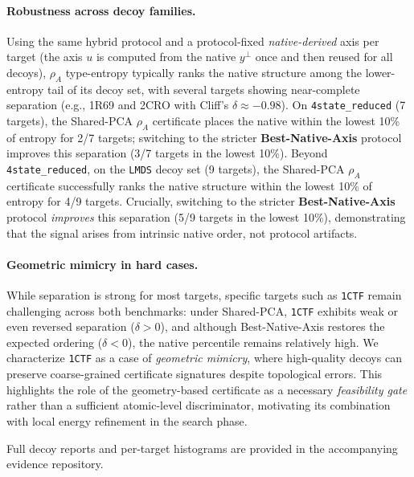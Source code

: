 \paragraph{Robustness across decoy families.}
Using the same hybrid protocol and a protocol-fixed \emph{native-derived} axis per target (the axis $u$ is computed from the native $y^\perp$ once and then reused for all decoys), $\rho_A$ type-entropy typically ranks the native structure among the lower-entropy tail of its decoy set, with several targets showing near-complete separation (e.g., 1R69 and 2CRO with Cliff's $\delta \approx -0.98$).
On \texttt{4state\_reduced} (7 targets), the Shared-PCA $\rho_A$ certificate places the native within the lowest 10\% of entropy for 2/7 targets; switching to the stricter \textbf{Best-Native-Axis} protocol improves this separation (3/7 targets in the lowest 10\%).
Beyond \texttt{4state\_reduced}, on the \texttt{LMDS} decoy set (9 targets), the Shared-PCA $\rho_A$ certificate successfully ranks the native structure within the lowest 10\% of entropy for 4/9 targets. Crucially, switching to the stricter \textbf{Best-Native-Axis} protocol \textit{improves} this separation (5/9 targets in the lowest 10\%), demonstrating that the signal arises from intrinsic native order, not protocol artifacts.

\paragraph{Geometric mimicry in hard cases.}
While separation is strong for most targets, specific targets such as \texttt{1CTF} remain challenging across both benchmarks: under Shared-PCA, \texttt{1CTF} exhibits weak or even reversed separation ($\delta>0$), and although Best-Native-Axis restores the expected ordering ($\delta<0$), the native percentile remains relatively high. We characterize \texttt{1CTF} as a case of \textit{geometric mimicry}, where high-quality decoys can preserve coarse-grained certificate signatures despite topological errors. This highlights the role of the geometry-based certificate as a necessary \textit{feasibility gate} rather than a sufficient atomic-level discriminator, motivating its combination with local energy refinement in the search phase.

Full decoy reports and per-target histograms are provided in the accompanying evidence repository.

